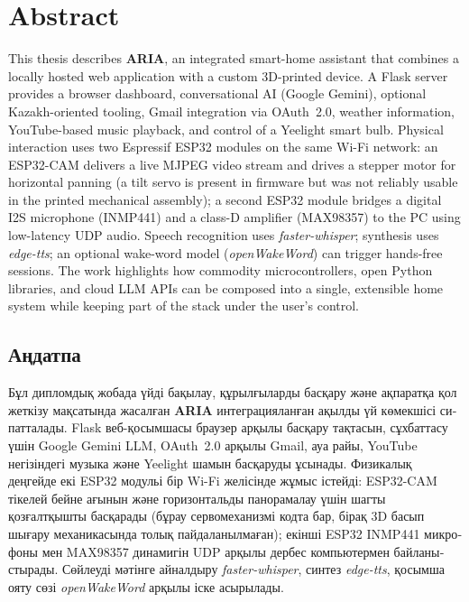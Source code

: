 \documentclass[12pt,a4paper]{report}
\begin{document}
\chapter*{Abstract}

This thesis describes \textbf{ARIA}, an integrated smart-home assistant that combines a locally hosted web application with a custom 3D-printed device. A Flask server provides a browser dashboard, conversational AI (Google Gemini), optional Kazakh-oriented tooling, Gmail integration via OAuth~2.0, weather information, YouTube-based music playback, and control of a Yeelight smart bulb. Physical interaction uses two Espressif ESP32 modules on the same Wi-Fi network: an ESP32-CAM delivers a live MJPEG video stream and drives a stepper motor for horizontal panning (a tilt servo is present in firmware but was not reliably usable in the printed mechanical assembly); a second ESP32 module bridges a digital I2S microphone (INMP441) and a class-D amplifier (MAX98357) to the PC using low-latency UDP audio. Speech recognition uses \textit{faster-whisper}; synthesis uses \textit{edge-tts}; an optional wake-word model (\textit{openWakeWord}) can trigger hands-free sessions. The work highlights how commodity microcontrollers, open Python libraries, and cloud LLM APIs can be composed into a single, extensible home system while keeping part of the stack under the user's control.

\begin{otherlanguage}{russian}
\chapter*{Аңдатпа}
Бұл дипломдық жобада үйді бақылау, құрылғыларды басқару және ақпаратқа қол жеткізу мақсатында жасалған \textbf{ARIA} интеграцияланған ақылды үй көмекшісі сипатталады. Flask веб-қосымшасы браузер арқылы басқару тақтасын, сұхбаттасу үшін Google Gemini LLM, OAuth~2.0 арқылы Gmail, ауа райы, YouTube негізіндегі музыка және Yeelight шамын басқаруды ұсынады. Физикалық деңгейде екі ESP32 модульі бір Wi-Fi желісінде жұмыс істейді: ESP32-CAM тікелей бейне ағынын және горизонтальды панорамалау үшін шагты қозғалтқышты басқарады (бұрау сервомеханизмі кодта бар, бірақ 3D басып шығару механикасында толық пайдаланылмаған); екінші ESP32 INMP441 микрофоны мен MAX98357 динамигін UDP арқылы дербес компьютермен байланыстырады. Сөйлеуді мәтінге айналдыру \textit{faster-whisper}, синтез \textit{edge-tts}, қосымша ояту сөзі \textit{openWakeWord} арқылы іске асырылады.
\end{otherlanguage}
\end{document}
